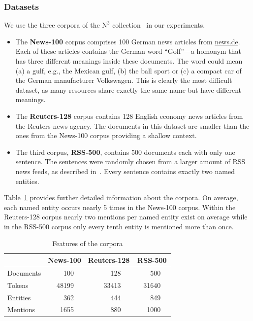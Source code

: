 \documentclass{llncs}
\begin{document}
\subsubsection{Datasets}
We use the three corpora of the $\mbox{N}^3$ collection~\cite{N3} in our experiments.
%
\begin{itemize}
\item The \textbf{News-100} corpus comprises 100 German news articles from \url{news.de}.
Each of these articles contains the German word ``Golf''---a homonym that has three different meanings inside these documents.
The word could mean (a) a gulf, e.g., the Mexican gulf, (b) the ball sport or (c) a compact car of the German manufacturer Volkswagen.
This is clearly the most difficult dataset, as many resources share exactly the same name but have different meanings. 
\item The \textbf{Reuters-128} corpus contains 128 English economy news articles from the Reuters news agency.
The documents in this dataset are smaller than the ones from the News-100 corpus providing a shallow context.
\item The third corpus, \textbf{RSS-500}, contains 500 documents each with only one sentence.
The sentences were randomly chosen from a larger amount of RSS news feeds, as described in~\cite{GER+13}.
Every sentence contains exactly two named entities.
\end{itemize}
Table~\ref{tab:corpusStats} provides further detailed information about the corpora.
On average, each named entity occurs nearly 5 times in the News-100 corpus.
Within the Reuters-128 corpus nearly two mentions per named entity exist on average while in the RSS-500 corpus only every tenth entity is mentioned more than once.


\begin{table}[thb]
    \caption{Features of the corpora}
    \begin{tabular}{lp{0.7cm}rp{0.3cm}p{0.7cm}rp{0.2cm}p{0.6cm}rp{0.3cm}}
    \toprule
     & \multicolumn{3}{c}{\textbf{News-100}} & \multicolumn{3}{c}{\textbf{Reuters-128}} & \multicolumn{3}{c}{\textbf{RSS-500}} \\
    \midrule
    Documents && 100 &&& 128 &&& 500 &\\
	Tokens && 48199 &&& 33413 &&& 31640 &\\
	Entities && 362 &&& 444 &&& 849 &\\
    Mentions && 1655 &&& 880 &&& 1000 &\\
	\bottomrule
	\end{tabular}
	\centering
	\label{tab:corpusStats}
\end{table}
\end{document}
